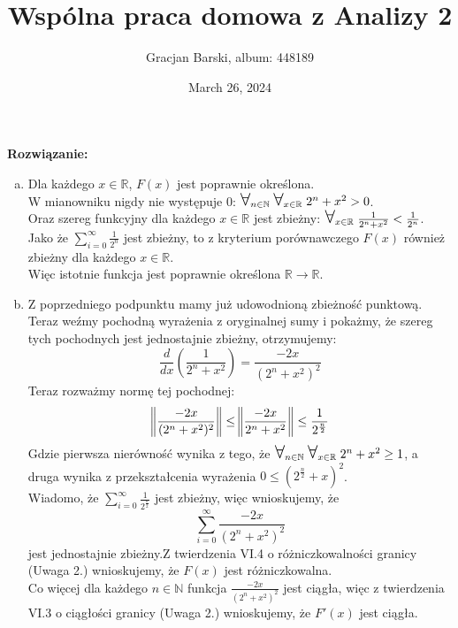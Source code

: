 \documentclass[11pt]{article}
\title{Wspólna praca domowa z Analizy 2}
\author{Gracjan Barski, album: 448189}
\date{March 26, 2024}
\newcommand{\R}{\mathbb{R}}
\newcommand{\N}{\mathbb{N}}
\newcommand{\Dis}{\displaystyle}
\newcommand{\Forall}{{\Large\mbox{$\forall$}}}
\begin{document}
\maketitle
\onehalfspacing
\textbf{Rozwiązanie:}
\begin{enumerate}[(a)]
    \item Dla każdego $x \in \R$, $F(x)$ jest poprawnie określona. \\[5pt]
    W mianowniku nigdy nie występuje 0: $\Forall_{n \in \N} \; \Forall_{x\in\R} \; 2^n + x^2 > 0$. \\[5pt]
    Oraz szereg funkcyjny dla każdego $x \in \R$ jest zbieżny: $\Forall_{x\in\R} \; \frac{1}{2^n + x^2} < \frac{1}{2^n}$. Jako że $\sum_{i = 0}^\infty \frac{1}{2^n}$ jest zbieżny, to z kryterium porównawczego $F(x)$ również zbieżny dla każdego $x \in \R$. \\[5pt]
    Więc istotnie funkcja jest poprawnie określona $\R \to \R$.

    \item Z poprzedniego podpunktu mamy już udowodnioną zbieżność punktową. Teraz weźmy pochodną wyrażenia z oryginalnej sumy i pokażmy, że szereg tych pochodnych jest jednostajnie zbieżny, otrzymujemy: \\[5pt]
    $$\frac{d}{dx}\left(\frac{1}{2^n+x^2}\right) = \frac{-2x}{(2^n+x^2)^2}$$
    Teraz rozważmy normę tej pochodnej:
    $$\norm{\frac{-2x}{(2^n+x^2)^2}} \leq \norm{\frac{-2x}{2^n+x^2}} \leq \frac{1}{2^{\frac{n}{2}}}$$
    Gdzie pierwsza nierówność wynika z tego, że $\Forall_{n \in \N} \; \Forall_{x\in\R} \; 2^n + x^2 \geq 1$, a druga wynika z przekształcenia wyrażenia $\Dis 0 \leq (2^{\frac{n}{2}} + x)^2$. \\[5pt]
    Wiadomo, że $\sum_{i = 0}^\infty \frac{1}{2^{\frac{n}{2}}}$ jest zbieżny, więc wnioskujemy, że
    $$\sum_{i = 0}^\infty \frac{-2x}{(2^n+x^2)^2}$$
    jest jednostajnie zbieżny.Z twierdzenia VI.4 o różniczkowalności granicy (Uwaga 2.) wnioskujemy, że $F(x)$ jest różniczkowalna. \\[5pt]
    Co więcej dla każdego $n \in \N$ funkcja $\frac{-2x}{(2^n+x^2)^2}$ jest ciągła, więc z twierdzenia VI.3 o ciągłości granicy (Uwaga 2.) wnioskujemy, że $F'(x)$ jest ciągła.


\end{enumerate}
\end{document}
